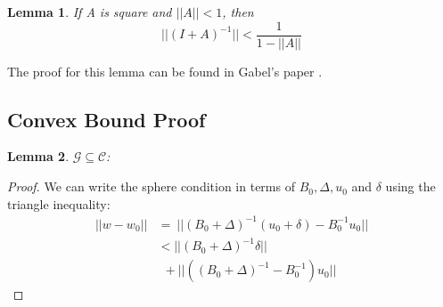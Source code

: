 \documentclass[11pt,twocolumn,varwidth=true,a4paper,fleqn]{article}
\newtheorem{lemma}{Lemma}
\begin{document}
\begin{lemma} \label{lemma:newman}
If A is square and $||A|| < 1$, then
\begin{equation*}
||(I+A)^{-1}|| < \frac{1}{1-||A||}
\end{equation*}
\end{lemma}
The proof for this lemma can be found in Gabel's paper
\cite{gabel2015monitoring}.

\subsection{Convex Bound Proof}
\begin{lemma}
$\mathcal{G} \subseteq \mathcal{C}$:
\end{lemma}

\begin{proof}
We can write the sphere condition in terms of $B_0, \Delta, u_0$ and $\delta$ using the triangle
inequality:
\begin{equation} \label{in}
\begin{split}
||w-w_0|| & = \ ||(B_0+\Delta)^{-1}(u_0+\delta) - B_0^{-1}u_0|| \\
& < ||(B_0+\Delta)^{-1}\delta|| \\
& \ \ + ||((B_0+\Delta)^{-1} - B_0^{-1})u_0||
\end{split}
\end{equation}


\end{proof}
\end{document}
